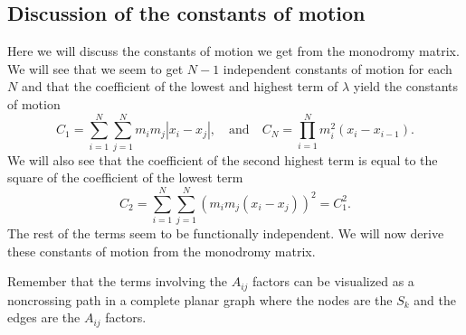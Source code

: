 \documentclass[english,master]{liumaiex}
\theoremstyle{plain}
\theoremstyle{definition}
\begin{document}
\subsection{Discussion of the constants of motion}
Here we will discuss the constants of motion we get from the monodromy matrix. We will see that we seem to get $N-1$ independent constants of motion for each $N$ and that the coefficient of the lowest and highest term of $\lambda$ yield the constants of motion
\begin{equation}
	C_1 = \sum_{i=1}^{N}\sum_{j=1}^N m_i m_j |x_i - x_j|,
	\quad \text{and} \quad
	C_N = \prod_{i=1}^{N} m_i^2 (x_i - x_{i-1}).
\end{equation}
We will also see that the coefficient of the second highest term is equal to the square of the coefficient of the lowest term
\begin{equation}
	C_2 = \sum_{i=1}^{N}\sum_{j=1}^N (m_i m_j (x_i - x_j))^2 = C_1^2.
\end{equation}
The rest of the terms seem to be functionally independent. We will now derive these constants of motion from the monodromy matrix.

Remember that the terms involving the $A_{ij}$ factors can be visualized as a noncrossing path in a complete planar graph where the nodes are the $S_k$ and the edges are the $A_{ij}$ factors.
\end{document}
